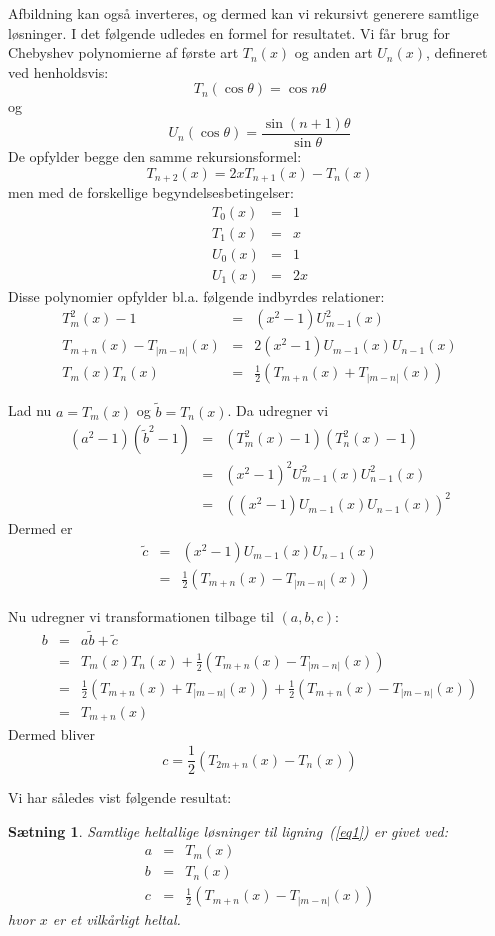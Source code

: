\documentclass[12pt,oneside,a4paper]{article}
\newcommand{\bas}{\begin{eqnarray*}}
\newcommand{\eas}{\end{eqnarray*}}
\newtheorem{thm}{Sætning}[section]
\begin{document}
Afbildning kan også inverteres, og dermed kan vi rekursivt generere samtlige
løsninger. I det følgende udledes en formel for resultatet. Vi får brug for
Chebyshev polynomierne af første art $T_n(x)$ og anden art $U_n(x)$, defineret
ved henholdsvis:
$$
T_n(\cos\theta) = \cos n\theta
$$
og
$$
U_n(\cos\theta) = \frac{\sin (n+1)\theta}{\sin\theta}
$$
De opfylder begge den samme rekursionsformel:
$$
T_{n+2}(x) = 2xT_{n+1}(x) - T_n(x)
$$
men med de forskellige begyndelsesbetingelser:
\bas
T_0(x) &=& 1 \\
T_1(x) &=& x \\
U_0(x) &=& 1 \\
U_1(x) &=& 2x
\eas
Disse polynomier opfylder bl.a. følgende indbyrdes relationer:
\bas
T_m^2(x) - 1 &=& (x^2-1)U_{m-1}^2(x) \\
T_{m+n}(x) - T_{|m-n|}(x) &=& 2(x^2-1)U_{m-1}(x)U_{n-1}(x) \\
T_m(x) T_n(x) &=& \frac12 \left(T_{m+n}(x) + T_{|m-n|}(x)\right)
\eas

Lad nu $a=T_m(x)$ og $\tilde b = T_n(x)$. Da udregner vi 
\bas
(a^2-1)({\tilde b}^2-1) &=& (T_m^2(x)-1)(T_n^2(x)-1) \\
                        &=& (x^2-1)^2 U_{m-1}^2(x) U_{n-1}^2(x) \\
                        &=& \left( (x^2-1) U_{m-1}(x) U_{n-1}(x)\right)^2
\eas
Dermed er 
\bas
\tilde c &=& (x^2-1) U_{m-1}(x) U_{n-1}(x) \\
         &=& \frac 12 \left(T_{m+n}(x) - T_{|m-n|}(x)\right)
\eas

Nu udregner vi transformationen tilbage til $(a,b,c)$:
\bas
b &=& a\tilde b + \tilde c \\
  &=& T_m(x) T_n(x) + \frac 12 \left(T_{m+n}(x) - T_{|m-n|}(x)\right) \\
  &=& \frac12 \left(T_{m+n}(x) + T_{|m-n|}(x)\right) + \frac 12 \left(T_{m+n}(x) - T_{|m-n|}(x)\right) \\
  &=& T_{m+n}(x)
\eas
Dermed bliver 
$$
c = \frac 12 \left(T_{2m+n}(x) - T_{n}(x)\right)
$$

Vi har således vist følgende resultat:
\begin{thm}
    Samtlige heltallige løsninger til ligning~(\ref{eq1}) er givet ved:
    \bas
    a &=& T_m(x) \\
    b &=& T_n(x) \\
    c &=& \frac 12 \left(T_{m+n}(x) - T_{|m-n|}(x)\right) 
    \eas
    hvor $x$ er et vilkårligt heltal.
\end{thm}
\end{document}
